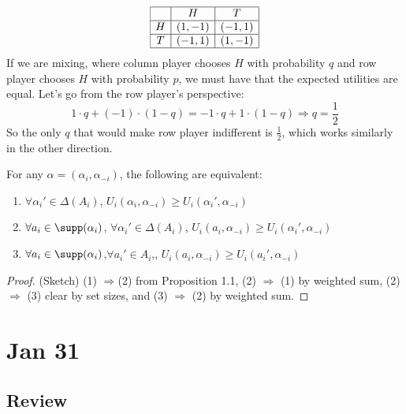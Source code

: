 \documentclass[10pt]{article}
\begin{document}
\begin{example}
	\[
	\begin{array}{|c|c|c|}
		\hline & H & T \\\hline 
		H & (1,-1) & (-1,1) \\\hline
		T & (-1,1) & (1,-1) \\\hline
	\end{array}
	\]
	If we are mixing, where column player chooses $H$ with probability $q$ and row player chooses $H$ with probability $p$, we must have that the expected utilities are equal. Let's go from the row player's perspective:
	\[
	1 \cdot q + (-1)\cdot (1-q) = -1 \cdot q + 1 \cdot (1-q) \Longrightarrow q = \frac{1}{2}
	\]
	So the only $q$ that would make row player indifferent is $\frac{1}{2}$, which works similarly in the other direction.
\end{example}

\begin{proposition}
	For any $\alpha = (\alpha_i,\alpha_{-i})$, the following are equivalent:
	\begin{enumerate}
		\item $\forall \alpha_i' \in \Delta(A_i)$, $U_i(\alpha_i,\alpha_{-i}) \ge U_i(\alpha_i',\alpha_{-i})$
		\item $\forall a_i \in \supp(\alpha_i)$, $\forall \alpha_i' \in \Delta(A_i)$, $U_i(a_i,\alpha_{-i}) \ge U_i(\alpha_i',\alpha_{-i})$
		\item $\forall a_i \in \supp(\alpha_i)$,$\forall a_i' \in A_i$,, $U_i(a_i,\alpha_{-i}) \ge U_i(a_i',\alpha_{-i})$
	\end{enumerate}
\end{proposition}
\begin{proof}
	(Sketch) (1) $\Longrightarrow$(2) from Proposition 1.1, (2) $\Longrightarrow$ (1) by weighted sum, (2) $\Longrightarrow$ (3) clear by set sizes, and (3) $\Longrightarrow$ (2) by weighted sum.
\end{proof}

\section{Jan 31}

\subsection{Review}
\end{document}
